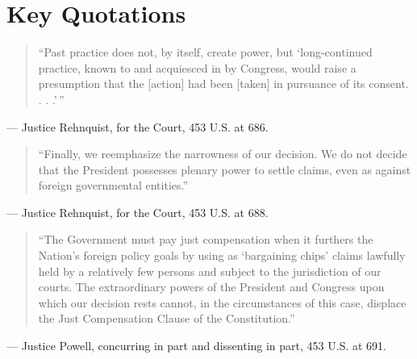 \documentclass[12pt]{article}
\begin{document}
\section{Key Quotations}

\begin{quote}
``Past practice does not, by itself, create power, but `long-continued practice, known to and acquiesced in by Congress, would raise a presumption that the [action] had been [taken] in pursuance of its consent. . . .'\,''
\end{quote}
\noindent --- Justice Rehnquist, for the Court, 453 U.S. at 686.

\begin{quote}
``Finally, we reemphasize the narrowness of our decision. We do not decide that the President possesses plenary power to settle claims, even as against foreign governmental entities.''
\end{quote}
\noindent --- Justice Rehnquist, for the Court, 453 U.S. at 688.

\begin{quote}
``The Government must pay just compensation when it furthers the Nation's foreign policy goals by using as `bargaining chips' claims lawfully held by a relatively few persons and subject to the jurisdiction of our courts. The extraordinary powers of the President and Congress upon which our decision rests cannot, in the circumstances of this case, displace the Just Compensation Clause of the Constitution.''
\end{quote}
\noindent --- Justice Powell, concurring in part and dissenting in part, 453 U.S. at 691.
\end{document}
